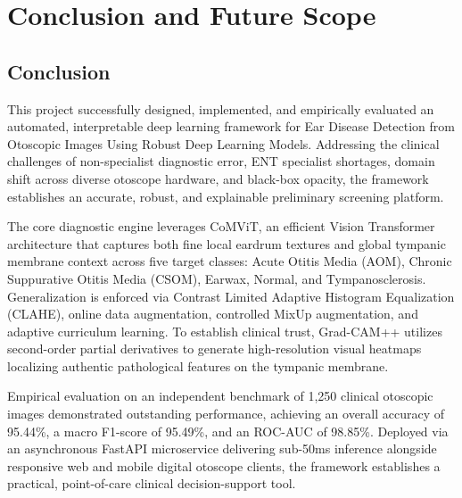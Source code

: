 \documentclass[12pt,a4paper]{report}
\renewcommand{\textbf}[1]{#1}
\begin{document}
\chapter{Conclusion and Future Scope}

\section{Conclusion}
This project successfully designed, implemented, and empirically evaluated an automated, interpretable deep learning framework for \textbf{Ear Disease Detection from Otoscopic Images Using Robust Deep Learning Models}. Addressing the clinical challenges of non-specialist diagnostic error, ENT specialist shortages, domain shift across diverse otoscope hardware, and black-box opacity, the framework establishes an accurate, robust, and explainable preliminary screening platform.

The core diagnostic engine leverages \textbf{CoMViT}, an efficient Vision Transformer architecture that captures both fine local eardrum textures and global tympanic membrane context across five target classes: \textbf{Acute Otitis Media (AOM)}, \textbf{Chronic Suppurative Otitis Media (CSOM)}, \textbf{Earwax}, \textbf{Normal}, and \textbf{Tympanosclerosis}. Generalization is enforced via \textbf{Contrast Limited Adaptive Histogram Equalization (CLAHE)}, \textbf{online data augmentation}, \textbf{controlled MixUp augmentation}, and \textbf{adaptive curriculum learning}. To establish clinical trust, \textbf{Grad-CAM++} utilizes second-order partial derivatives to generate high-resolution visual heatmaps localizing authentic pathological features on the tympanic membrane.

Empirical evaluation on an independent benchmark of 1,250 clinical otoscopic images demonstrated outstanding performance, achieving an overall accuracy of \textbf{95.44\%}, a macro F1-score of \textbf{95.49\%}, and an ROC-AUC of \textbf{98.85\%}. Deployed via an asynchronous \textbf{FastAPI} microservice delivering sub-50ms inference alongside responsive web and mobile digital otoscope clients, the framework establishes a practical, point-of-care clinical decision-support tool.
\end{document}
